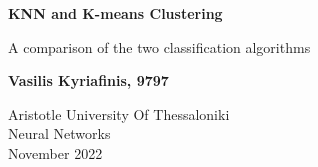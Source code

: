 \author{Vasilis Kyriafinis \\ email: \href{mailto:vakyriaf@ece.auth.gr}{vakyriaf@ece.auth.gr}} 

\makeatletter
\begin{titlepage}
    \begin{center}
        \vspace*{4cm}
 
        \textbf{\Large{KNN and K-means Clustering}}
 
        \vspace{0.5cm}
        \large{A comparison of the two classification algorithms}
             
        \vspace{1cm}
 
        \textbf{Vasilis Kyriafinis, 9797}
 
        \vfill
                                
        Aristotle University Of Thessaloniki\\
        Neural Networks\\
        November 2022
        \vspace*{0cm}
             
    \end{center}
\end{titlepage}